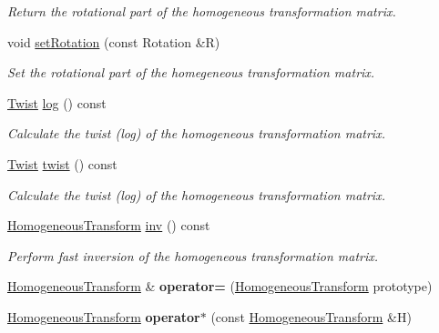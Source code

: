 \begin{DoxyCompactItemize}
\begin{DoxyCompactList}\small\item\em Return the rotational part of the homogeneous transformation matrix. \end{DoxyCompactList}\item 
void \hyperlink{class_homogeneous_transform_a7e886ffa6d5895a58a16a12f29deee03}{set\+Rotation} (const Rotation \&R)
\begin{DoxyCompactList}\small\item\em Set the rotational part of the homegeneous transformation matrix. \end{DoxyCompactList}\item 
\hyperlink{class_twist}{Twist} \hyperlink{class_homogeneous_transform_aef0b855f423a9a33cc2756f35de17644}{log} () const 
\begin{DoxyCompactList}\small\item\em Calculate the twist (log) of the homogeneous transformation matrix. \end{DoxyCompactList}\item 
\hyperlink{class_twist}{Twist} \hyperlink{class_homogeneous_transform_a8b70339a22dbdd11947f54e88def29b0}{twist} () const 
\begin{DoxyCompactList}\small\item\em Calculate the twist (log) of the homogeneous transformation matrix. \end{DoxyCompactList}\item 
\hypertarget{class_homogeneous_transform_a1b40d50970b8c1325c6ea0c4dd24014a}{\hyperlink{class_homogeneous_transform}{Homogeneous\+Transform} \hyperlink{class_homogeneous_transform_a1b40d50970b8c1325c6ea0c4dd24014a}{inv} () const }\label{class_homogeneous_transform_a1b40d50970b8c1325c6ea0c4dd24014a}

\begin{DoxyCompactList}\small\item\em Perform fast inversion of the homogeneous transformation matrix. \end{DoxyCompactList}\item 
\hypertarget{class_homogeneous_transform_af53a69f13c973961e76634106babd490}{\hyperlink{class_homogeneous_transform}{Homogeneous\+Transform} \& {\bfseries operator=} (\hyperlink{class_homogeneous_transform}{Homogeneous\+Transform} prototype)}\label{class_homogeneous_transform_af53a69f13c973961e76634106babd490}

\item 
\hypertarget{class_homogeneous_transform_ae6a22f06e782ba4a1521c7bc5d6348d6}{\hyperlink{class_homogeneous_transform}{Homogeneous\+Transform} {\bfseries operator$\ast$} (const \hyperlink{class_homogeneous_transform}{Homogeneous\+Transform} \&H)}\label{class_homogeneous_transform_ae6a22f06e782ba4a1521c7bc5d6348d6}


\end{DoxyCompactItemize}
